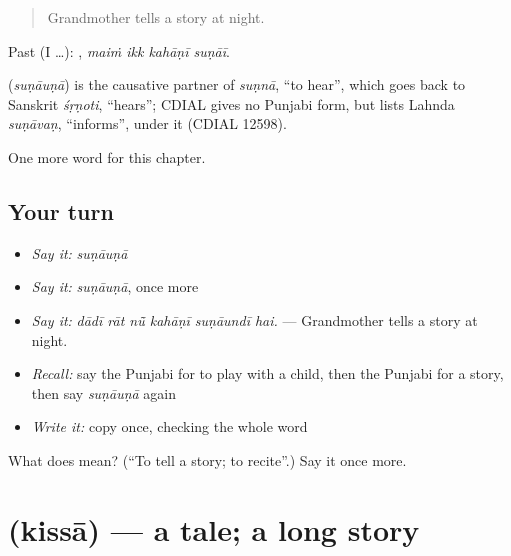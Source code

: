 \begin{quote}
Grandmother tells a story at night.
\end{quote}

Past (I …):    , \emph{maiṁ ikk kahāṇī suṇāī}.

\begin{cousinweb}
\textbf{} (\emph{suṇāuṇā}) is the causative partner of \emph{suṇnā}, \textquotedblleft{}to hear\textquotedblright{}, which goes back to Sanskrit \emph{śṛṇoti}, \textquotedblleft{}hears\textquotedblright{}; CDIAL gives no Punjabi form, but lists Lahnda \emph{suṇāvaṇ}, \textquotedblleft{}informs\textquotedblright{}, under it (CDIAL 12598).
\end{cousinweb}

\begin{grammarlens}[title={What you've built}]
One more word for this chapter.
\end{grammarlens}

\subsection*{Your turn}
\begin{itemize}
\raggedright
  \item \emph{Say it:} \emph{suṇāuṇā}
  \item \emph{Say it:} \emph{suṇāuṇā}, once more
  \item \emph{Say it:} \emph{dādī rāt nū̃ kahāṇī suṇāundī hai.} — Grandmother tells a story at night.
  \item \emph{Recall:} say the Punjabi for to play with a child, then the Punjabi for a story, then say \emph{suṇāuṇā} again
  \item \emph{Write it:} copy \textbf{} once, checking the whole word
\end{itemize}

\begin{tcolorbox}[breakable,colback=teal!4,colframe=teal!35!black,title={Before you move on}]
What does  mean? (\textquotedblleft{}To tell a story; to recite\textquotedblright{}.) Say it once more.
\end{tcolorbox}
\section[\texorpdfstring{\pa{ਕਿੱਸਾ} (kissā)}{ਕਿੱਸਾ (kissā)}]{ (kissā) — a tale; a long story}

\label{lesson:PA-C354-kissa}



